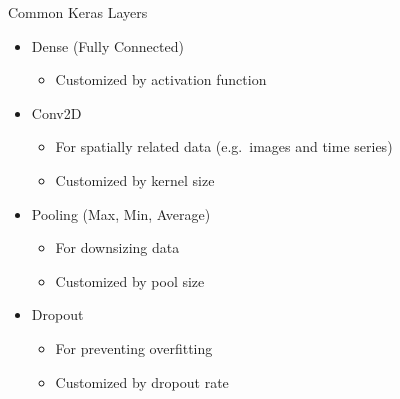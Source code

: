 \documentclass{beamer}
\begin{document}
	\begin{frame}{Common Keras Layers}
	\begin{itemize}
		\item Dense (Fully Connected)
		\begin{itemize}
			\item Customized by activation function
		\end{itemize}
		\item Conv2D
		\begin{itemize}
			\item For spatially related data (e.g.\ images and time series)
			\item Customized by kernel size
		\end{itemize}
		\item Pooling (Max, Min, Average)
		\begin{itemize}
			\item For downsizing data
			\item Customized by pool size
		\end{itemize}
		\item Dropout
		\begin{itemize}
			\item For preventing overfitting
			\item Customized by dropout rate
		\end{itemize}
	\end{itemize}
	\end{frame}
\end{document}
